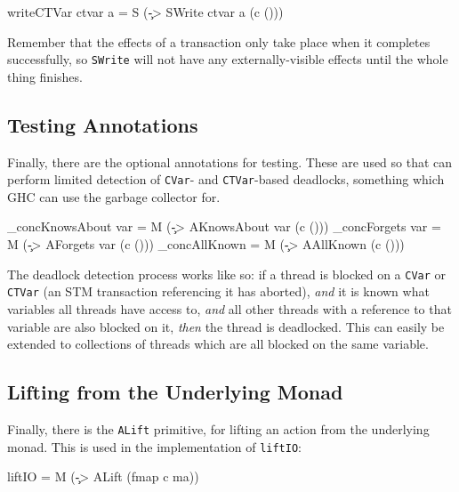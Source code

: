 
\begin{haskellcode}
writeCTVar ctvar a = S (\c -> SWrite ctvar a (c ()))
\end{haskellcode}


Remember that the effects of a transaction only take place when it
completes successfully, so \verb|SWrite| will not have any
externally-visible effects until the whole thing finishes.

\subsection{Testing Annotations}
\label{sec:execution-primops-annotations}

Finally, there are the optional annotations for testing. These are
used so that \dejafu{} can perform limited detection of \verb|CVar|-
and \verb|CTVar|-based deadlocks, something which GHC can use the
garbage collector for.

\begin{haskellcode}
_concKnowsAbout var = M (\c -> AKnowsAbout var (c ()))
_concForgets    var = M (\c -> AForgets    var (c ()))
_concAllKnown       = M (\c -> AAllKnown       (c ()))
\end{haskellcode}




The deadlock detection process works like so: if a thread is blocked
on a \verb|CVar| or \verb|CTVar| (an STM transaction referencing it
has aborted), \emph{and} it is known what variables all threads have
access to, \emph{and} all other threads with a reference to that
variable are also blocked on it, \emph{then} the thread is
deadlocked. This can easily be extended to collections of threads
which are all blocked on the same variable.

\subsection{Lifting from the Underlying Monad}
\label{sec:execution-primops-lift}

Finally, there is the \verb|ALift| primitive, for lifting an action
from the underlying monad. This is used in the implementation of
\verb|liftIO|:

\begin{haskellcode}
liftIO = M (\c -> ALift (fmap c ma))
\end{haskellcode}

